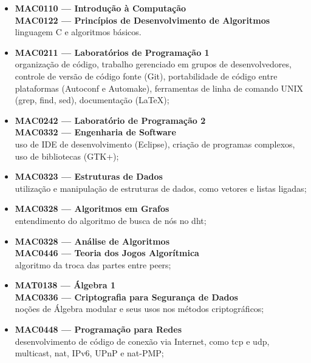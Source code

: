 \begin{itemize}
    \item \textbf{MAC0110 --- Introdução à Computação} \\
        \textbf{MAC0122 --- Princípios de Desenvolvimento de Algoritmos} \\
        linguagem C e algoritmos básicos.

    \item \textbf{MAC0211 --- Laboratórios de Programação 1} \\
        organização de código, trabalho gerenciado em grupos de desenvolvedores,
        controle de versão de código fonte (Git), portabilidade de código entre
        plataformas (Autoconf e Automake), ferramentas de linha de comando UNIX (grep,
        find, sed), documentação (\LaTeX);

    \item \textbf{MAC0242 --- Laboratório de Programação 2} \\
        \textbf{MAC0332 --- Engenharia de Software} \\
        uso de IDE de desenvolvimento (Eclipse), criação de programas complexos,
        uso de bibliotecas (GTK+);

    \item \textbf{MAC0323 --- Estruturas de Dados} \\
        utilização e manipulação de estruturas de dados, como vetores e listas ligadas;

    \item \textbf{MAC0328 --- Algoritmos em Grafos} \\
        entendimento do algoritmo de busca de nós no \gls{dht};

    \item \textbf{MAC0328 --- Análise de Algoritmos} \\
        \textbf{MAC0446 --- Teoria dos Jogos Algorítmica} \\
        algoritmo da troca das partes entre \glspl{peer};

    \item \textbf{MAT0138 --- Álgebra 1} \\
        \textbf{MAC0336 --- Criptografia para Segurança de Dados} \\
        noções de Álgebra modular e seus usos nos métodos criptográficos;

    \item \textbf{MAC0448 --- Programação para Redes} \\
        desenvolvimento de código de conexão via Internet, como \gls{tcp} e \gls{udp},
        multicast, \gls{nat}, IPv6, UPnP e \gls*{nat}-PMP;


\end{itemize}
